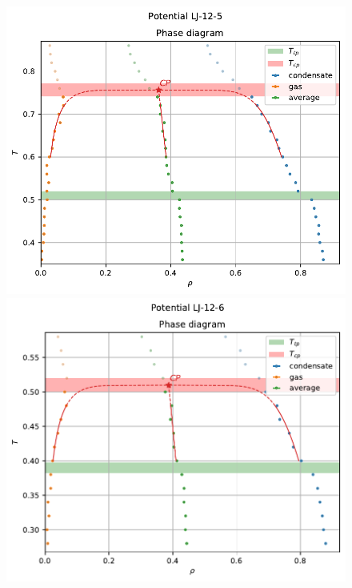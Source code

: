 \documentclass[pdf,hyperref={unicode}]{beamer}
\begin{document}
\begin{frame}
\begin{columns}
\begin{column}{0.72\linewidth}
{\begin{figure}[h]
\begin{center}
\begin{minipage}[h]{0.47\linewidth}
\includegraphics[width=\textwidth, keepaspectratio]{plot_phase_diagram_Potential LJ-12-5_1}
\end{minipage}
\begin{minipage}[h]{0.47\linewidth}
\includegraphics[width=\textwidth, keepaspectratio]{plot_phase_diagram_Potential LJ-12-6_1}
\end{minipage}
\label{risPhaseDiagrammExp}
\end{center}
\end{figure}
}
\end{column}


\end{columns}
\end{frame}
\end{document}

